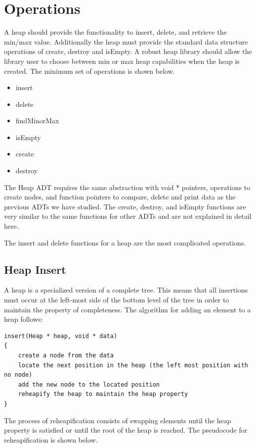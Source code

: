 \section{Operations}
A heap should provide the functionality to insert, delete, and retrieve the min/max value.    Additionally the heap must provide the standard data structure operations of create, destroy and isEmpty.   A robust heap library should allow the library user to choose between min or max heap capabilities when the heap is created.  The minimum set of operations is shown below.  

\begin{itemize}
\item insert
\item delete
\item findMinorMax
\item isEmpty
\item create
\item destroy
\end{itemize}

The Heap ADT requires the same abstraction with void * pointers,   operations to create nodes,  and function pointers to compare, delete and print data as the previous ADTs we have studied.     The create, destroy, and isEmpty functions are very similar to the same functions for other ADTs and are not explained in detail here.

The insert and delete functions for a heap are the most complicated operations.   

\subsection{Heap Insert}

A heap is a specialized version of a complete tree.  This means that all insertions must occur at the left-most side of the bottom level of the tree in order to maintain the property of completeness.   The algorithm for adding an element to a heap follows:
\begin{lstlisting}
insert(Heap * heap, void * data)
{
    create a node from the data
    locate the next position in the heap (the left most position with no node)
    add the new node to the located position
    reheapify the heap to maintain the heap property
}
\end{lstlisting}

The process of reheapification consists of swapping elements until the heap property is satisfied or until the root of the heap is reached.  The pseudocode for reheapification is shown below.

